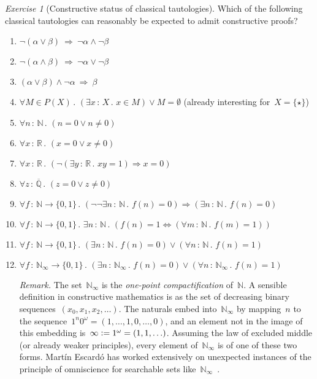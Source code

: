 \documentclass[10pt,reqno,a4paper,openany]{amsbook}
\theoremstyle{definition}
\theoremstyle{plain}
\theoremstyle{remark}
\newcommand{\NN}{\mathbb{N}}
\newcommand{\RR}{\mathbb{R}}
\newcommand{\QQ}{\mathbb{Q}}
\newcommand{\?}{\,{:}\,}
\renewcommand{\_}{\mathpunct{.}\,}
\newcommand{\defeq}{\vcentcolon=}
\newtheorem{exercise}[defn]{Exercise}
\begin{document}
\begin{exercise}[Constructive status of classical tautologies]
Which of the following classical tautologies can reasonably be expected to
admit constructive proofs?
\begin{enumerate}
\item $\neg(\alpha \vee \beta) \ \Longrightarrow\ \neg\alpha \wedge \neg\beta$
\item $\neg(\alpha \wedge \beta) \ \Longrightarrow\ \neg\alpha \vee \neg\beta$
\item $(\alpha \vee \beta) \wedge \neg\alpha \ \Longrightarrow\ \beta$
\item $\forall M \in P(X)\_ (\exists x\?X\_ x \in M) \vee M = \emptyset$
(already interesting for~$X = \{\star\}$)
\item $\forall n\?\NN\_ (n = 0 \vee n \neq 0)$
\item $\forall x\?\RR\_ (x = 0 \vee x \neq 0)$
\item $\forall x\?\RR\_ (\neg(\exists y\?\RR\_ xy=1) \Rightarrow x = 0)$
\item $\forall z\?\overline{\QQ}\_ (z = 0 \vee z \neq 0)$
\item $\forall f \? \NN \to \{0,1\}\_ (\neg\neg\exists n \? \NN\_ f(n) = 0)
\Rightarrow (\exists n \? \NN\_ f(n) = 0)$
\item $\forall f \? \NN \to \{0,1\}\_ \exists n \? \NN\_ (f(n) = 1
\Leftrightarrow (\forall m \? \NN\_ f(m) = 1))$
\item $\forall f \? \NN \to \{0,1\}\_ (\exists n \? \NN\_ f(n) = 0) \vee
(\forall n \? \NN\_ f(n) = 1)$
\item $\forall f \? \NN_\infty \to \{0,1\}\_ (\exists n \? \NN_\infty\_ f(n) = 0) \vee
(\forall n \? \NN_\infty\_ f(n) = 1)$

{\noindent\scriptsize\emph{Remark.} The set~$\NN_\infty$ is the \emph{one-point
compactification} of~$\NN$. A sensible definition in constructive mathematics
is as the set of decreasing binary sequences~$(x_0,x_1,x_2,\ldots)$. The
naturals embed into~$\NN_\infty$ by mapping~$n$ to the sequence~$1^n 0^\omega =
(1,\ldots,1,0,\ldots,0)$, and an element not in the image of this embedding
is~$\infty \defeq 1^\omega = (1,1,\ldots)$. Assuming the law of excluded
middle (or already weaker principles), every element of~$\NN_\infty$ is of one
of these two forms. Martín Escardó has worked extensively on unexpected
instances of the principle of omniscience for searchable sets
like~$\NN_\infty$~\cite{escardo:omniscience1,escardo:omniscience2,escardo:omniscience}.\par}
\end{enumerate}
\end{exercise}
\end{document}
